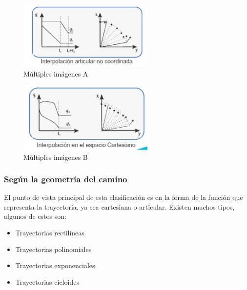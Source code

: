            \begin{figure}[htb]
             \centering
             \label{f:cap4_tray_4a}
                \includegraphics[width=0.6\textwidth]{Main/Chapter4/Images4/cap4_tray_4a.png}
             \caption{Múltiples imágenes A}
        \end{figure}            


           \begin{figure}[htb]
             \centering
             \label{f:cap4_tray_4b}
                \includegraphics[width=0.6\textwidth]{Main/Chapter4/Images4/cap4_tray_4b.png}
             \caption{Múltiples imágenes B}
        \end{figure}         
            
            
         \newpage   
        
        \subsubsection{Según la geometría del camino }
            El punto de vista principal de esta clasificación es en la forma de la función que representa la trayectoria, ya sea cartesiana o articular. Existen muchos tipos, algunos de estos son:
            \begin{itemize}
                \item         Trayectorias rectilíneas
                \item        Trayectorias polinomiales
                \item        Trayectorias exponenciales
                \item        Trayectorias cicloides
            \end{itemize}
                
